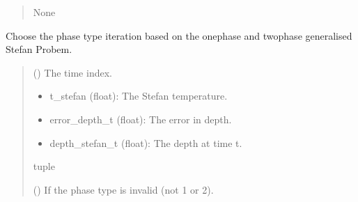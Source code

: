 \documentclass[a4paper,11pt,english,openany]{sphinxmanual}
\begin{document}
\begin{fulllineitems}
\begin{fulllineitems}
\begin{quote}
\begin{description}
\begin{itemize}
\end{itemize}

\sphinxAtStartPar
None

\end{description}\end{quote}

\end{fulllineitems}


\begin{fulllineitems}
\label{\detokenize{api/spyice.models.sea_ice_model:spyice.models.sea_ice_model.SeaIceModel.choose_phase_type_iteration}}
\pysigstartsignatures
{}
\pysigstopsignatures
\sphinxAtStartPar
Choose the phase type iteration based on the one\sphinxhyphen{}phase and two\sphinxhyphen{}phase generalised Stefan Probem.
\begin{quote}\begin{description}
\sphinxAtStartPar
{} () \textendash{} The time index.

\sphinxAtStartPar
\begin{description}
\begin{itemize}
\item {} 
\sphinxAtStartPar
t\_stefan (float): The Stefan temperature.

\item {} 
\sphinxAtStartPar
error\_depth\_t (float): The error in depth.

\item {} 
\sphinxAtStartPar
depth\_stefan\_t (float): The depth at time t.

\end{itemize}

\end{description}


\sphinxAtStartPar
tuple

\sphinxAtStartPar
{\hyperref[\detokenize{api/spyice.utils.spyice_exceptions:spyice.utils.spyice_exceptions.InvalidPhaseError}]{}} () \textendash{} If the phase type is invalid (not 1 or 2).


\end{description}
\end{quote}
\end{fulllineitems}
\end{fulllineitems}
\end{document}
